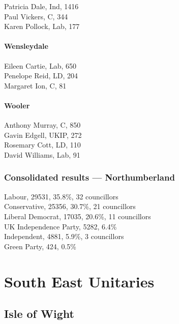 \documentclass[a4paper,openany,10pt]{book}
\begin{document}
Patricia Dale, Ind, 1416\\
Paul Vickers, C, 344\\
Karen Pollock, Lab, 177\\


\subsubsection*{Wensleydale}



Eileen Cartie, Lab, 650\\
Penelope Reid, LD, 204\\
Margaret Ion, C, 81\\


\subsubsection*{Wooler}



Anthony Murray, C, 850\\
Gavin Edgell, UKIP, 272\\
Rosemary Cott, LD, 110\\
David Williams, Lab, 91\\




\subsection*{Consolidated results --- Northumberland}
Labour, 29531, 35.8\%, 32 councillors\\
Conservative, 25356, 30.7\%, 21 councillors\\
Liberal Democrat, 17035, 20.6\%, 11 councillors\\
UK Independence Party, 5282, 6.4\% \\
Independent, 4881, 5.9\%, 3 councillors\\
Green Party, 424, 0.5\% \\


\chapter{South East Unitaries}

\section{Isle of Wight}
\end{document}
